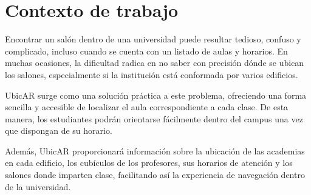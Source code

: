 \section{Contexto de trabajo}

Encontrar un salón dentro de una universidad puede resultar tedioso, confuso y complicado, incluso cuando se cuenta con un listado de aulas y horarios. En muchas ocasiones, la dificultad radica en no saber con precisión dónde se ubican los salones, especialmente si la institución está conformada por varios edificios.

UbicAR surge como una solución práctica a este problema, ofreciendo una forma sencilla y accesible de localizar el aula correspondiente a cada clase. De esta manera, los estudiantes podrán orientarse fácilmente dentro del campus una vez que dispongan de su horario.

Además, UbicAR proporcionará información sobre la ubicación de las academias en cada edificio, los cubículos de los profesores, sus horarios de atención y los salones donde imparten clase, facilitando así la experiencia de navegación dentro de la universidad.